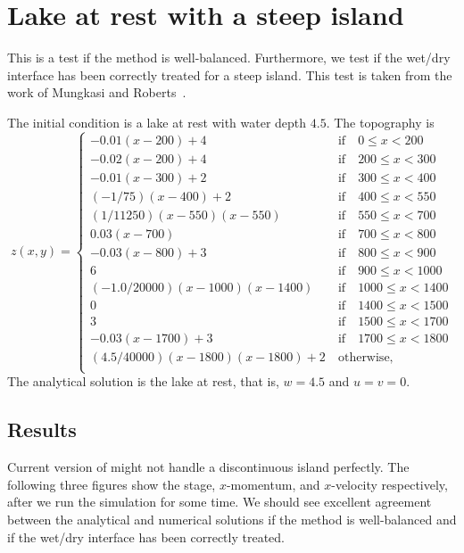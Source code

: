 
\section{Lake at rest with a steep island}

This is a test if the method is well-balanced. Furthermore, we test if the wet/dry interface has been correctly treated for a steep island. This test is taken from the work of Mungkasi and Roberts~\cite{MR2010}.

The initial condition is a lake at rest with water depth $4.5$. The topography is
\begin{equation}
z(x,y)= \left\{ \begin{array}{ll}
             -0.01(x-200) + 4& ~\textrm{if}\quad 0 \leq x < 200\\
             -0.02(x-200) + 4& ~\textrm{if}\quad 200 \leq x < 300\\
             -0.01(x-300) + 2& ~\textrm{if}\quad 300 \leq x < 400\\
             (-1/75)(x-400) + 2& ~\textrm{if}\quad 400 \leq x < 550\\
             (1/11250)(x-550)(x-550)& ~\textrm{if}\quad 550 \leq x < 700\\
             0.03(x-700)& ~\textrm{if}\quad 700 \leq x < 800\\
             -0.03(x-800) + 3& ~\textrm{if}\quad 800 \leq x < 900\\
             6& ~\textrm{if}\quad 900 \leq x < 1000\\
             (-1.0/20000)(x-1000)(x-1400)& ~\textrm{if}\quad 1000 \leq x < 1400\\
             0& ~\textrm{if}\quad 1400 \leq x < 1500\\
             3& ~\textrm{if}\quad 1500 \leq x < 1700\\
             -0.03(x-1700) + 3& ~\textrm{if}\quad 1700 \leq x < 1800\\
             (4.5/40000)(x-1800)(x-1800) + 2 & ~\textrm{otherwise,}\\
\end{array} \right.
\end{equation} 
The analytical solution is the lake at rest, that is, $w=4.5$ and $u=v=0$.

\subsection{Results}


Current version of \anuga{} might not handle a discontinuous island perfectly. The following three figures show the stage, $x$-momentum, and $x$-velocity respectively, after we run the simulation for some time. We should see excellent agreement between the analytical and numerical solutions if the method is well-balanced and if the wet/dry interface has been correctly treated.

